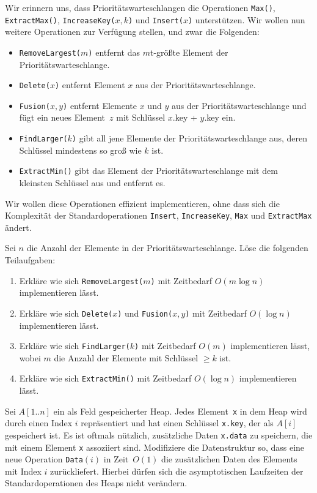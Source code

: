 \documentclass{uebung_cs}
\begin{document}
\begin{aufgabe}\hspace{.5em}
	Wir erinnern uns, dass Prio\-ri\-täts\-war\-te\-schlang\-en die Operationen \texttt{Max()}, \texttt{ExtractMax()}, \texttt{IncreaseKey($x,k$)} und \texttt{Insert($x$)} unterstützen.
	Wir wollen nun weitere Operationen zur Verfügung stellen, und zwar die Folgenden:
	\begin{itemize}
		\item \texttt{RemoveLargest($m$)} entfernt das $m$t-größte Element der Prioritätswarteschlange.
		\item \texttt{Delete($x$)} entfernt Element $x$ aus der Prioritätswarteschlange.
		\item \texttt{Fusion($x,y$)} entfernt Elemente $x$ und $y$ aus der Prioritätswarteschlange und fügt ein neues Element~$z$ mit Schlüssel $x$.key + $y$.key ein.
		\item \texttt{FindLarger($k$)} gibt all jene Elemente der Prioritätswarteschlange aus, deren Schlüssel mindestens so groß wie $k$ ist.
		\item \texttt{ExtractMin()} gibt das Element der Prioritätswarteschlange mit dem kleinsten Schlüssel aus und entfernt es.
	\end{itemize}
	Wir wollen diese Operationen effizient implementieren, ohne dass sich die Komplexität der Standardoperationen \texttt{Insert}, \texttt{IncreaseKey}, \texttt{Max} und \texttt{ExtractMax} ändert.

	Sei $n$ die Anzahl der Elemente in der Prioritätswarteschlange.
	Löse die folgenden Teilaufgaben:
	\begin{enumerate}
		\item \mittel Erkläre wie sich \texttt{RemoveLargest($m$)} mit Zeitbedarf $O(m\log n)$ implementieren lässt.
		\item \mittel Erkläre wie sich \texttt{Delete($x$)} und \texttt{Fusion($x,y$)} mit Zeitbedarf $O(\log n)$ implementieren lässt.
		\item \mittel %
    Erkläre wie sich \texttt{FindLarger($k$)} mit Zeitbedarf $O(m)$ implementieren lässt, wobei $m$ die Anzahl der Elemente mit Schlüssel $\geq k$ ist.
		\item \note %
    Erkläre wie sich \texttt{ExtractMin()} mit Zeitbedarf $O(\log n)$ implementieren lässt.
	\end{enumerate}
\end{aufgabe}

\begin{aufgabe}
	Sei $A[1..n]$ ein als Feld gespeicherter Heap.
	Jedes Element~\texttt{x} in dem Heap wird durch einen Index $i$ repräsentiert und hat einen Schlüssel \texttt{x.key}, der als $A[i]$ gespeichert ist.
	Es ist oftmals nützlich, zusätzliche Daten \texttt{x.data} zu speichern, die mit einem Element \texttt{x} assoziiert sind.
	Modifiziere die Datenstruktur so, dass eine neue Operation \texttt{Data$(i)$} in Zeit~$O(1)$ die zusätzlichen Daten des Elements mit Index $i$ zurückliefert. Hierbei dürfen sich die asymptotischen Laufzeiten der Standardoperationen des Heaps nicht verändern.
\end{aufgabe}
\end{document}
